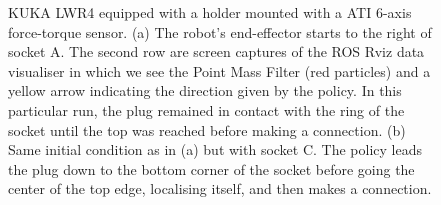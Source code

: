 \begin{figure}
 \centering
 \caption{KUKA LWR4 equipped with a holder mounted with a ATI 6-axis force-torque sensor. (a) The robot's end-effector starts to the 
 right of socket A. The second row are screen captures of the ROS Rviz data visualiser in which we see the Point Mass Filter 
 (red particles) and a yellow arrow indicating the direction given by the policy. In this particular run, the plug remained in contact with the ring of the socket until 
 the top was reached before making a connection. (b) Same initial condition as in (a) but with socket C. The policy leads the plug down to 
 the bottom corner of the socket before going the center of the top edge, localising itself, and then makes a connection.}
 \label{fig:real_pictures}
\end{figure}

